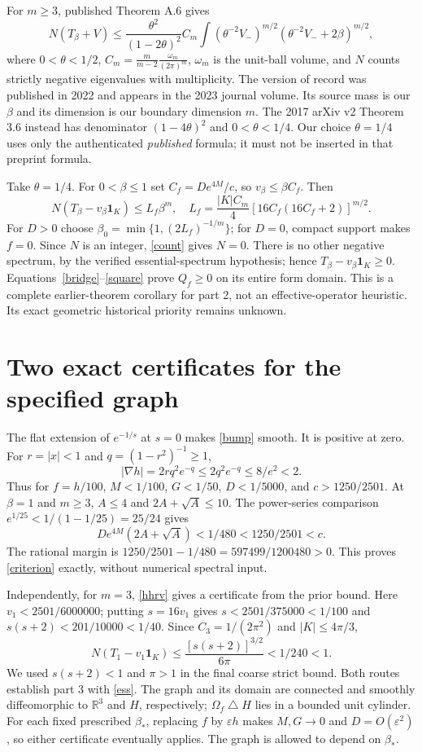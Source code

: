 \documentclass[11pt]{article}
\newcommand{\R}{\mathbb R}
\begin{document}
For $m\ge3$, published Theorem A.6 gives
\begin{equation}\label{hhrv}
 N(T_\beta+V)\le\frac{\theta^2}{(1-2\theta)^2}C_m
 \int(\theta^{-2}V_-)^{m/2}
      (\theta^{-2}V_-+2\beta)^{m/2},
\end{equation}
where $0<\theta<1/2$, $C_m=\frac m{m-2}\frac{\omega_m}{(2\pi)^m}$,
$\omega_m$ is the unit-ball volume, and $N$ counts strictly negative
eigenvalues with multiplicity. The version of record was published in 2022
and appears in the 2023 journal volume. Its source mass is our $\beta$ and
its dimension is our boundary dimension $m$. The 2017 arXiv v2
Theorem 3.6 instead has denominator $(1-4\theta)^2$ and
$0<\theta<1/4$. Our choice $\theta=1/4$ uses only the authenticated
\emph{published} formula; it must not be inserted in that preprint formula.

Take $\theta=1/4$. For $0<\beta\le1$ set $C_f=D e^{4M}/c$,
so $v_\beta\le\beta C_f$. Then
\begin{equation}\label{count}
 N(T_\beta-v_\beta\mathbf1_K)
 \le L_f\beta^m,\quad
 L_f=\frac{|K|C_m}{4}[16C_f(16C_f+2)]^{m/2}.
\end{equation}
For $D>0$ choose
$\beta_0=\min\{1,(2L_f)^{-1/m}\}$; for $D=0$, compact support makes
$f=0$. Since $N$ is an integer, \eqref{count} gives $N=0$.
There is no other negative spectrum, by the verified essential-spectrum
hypothesis; hence $T_\beta-v_\beta\mathbf1_K\ge0$.
Equations~\eqref{bridge}--\eqref{square} prove $Q_f\ge0$ on its entire
form domain. This is a complete earlier-theorem corollary for part 2,
not an effective-operator heuristic. Its exact geometric historical priority
remains unknown.

\section{Two exact certificates for the specified graph}
The flat extension of $e^{-1/s}$ at $s=0$ makes \eqref{bump} smooth.
It is positive at zero. For $r=|x|<1$ and $q=(1-r^2)^{-1}\ge1$,
\[
 |\nabla h|=2r q^2e^{-q}\le2q^2e^{-q}\le8/e^2<2.
\]
Thus for $f=h/100$, $M<1/100$, $G<1/50$, $D<1/5000$,
and $c>1250/2501$. At $\beta=1$ and $m\ge3$, $A\le4$ and
$2A+\sqrt A\le10$. The power-series comparison
$e^{1/25}<1/(1-1/25)=25/24$ gives
\[
 D e^{4M}(2A+\sqrt A)<1/480<1250/2501<c.
\]
The rational margin is $1250/2501-1/480=597499/1200480>0$.
This proves \eqref{criterion} exactly, without numerical spectral input.

Independently, for $m=3$, \eqref{hhrv} gives a certificate from the prior
bound. Here $v_1<2501/6000000$; putting $s=16v_1$ gives
$s<2501/375000<1/100$ and $s(s+2)<201/10000<1/40$.
Since $C_3=1/(2\pi^2)$ and $|K|\le4\pi/3$,
\[
 N(T_1-v_1\mathbf1_K)\le\frac{[s(s+2)]^{3/2}}{6\pi}<1/240<1.
\]
We used $s(s+2)<1$ and $\pi>1$ in the final coarse strict bound.
Both routes establish part 3 with \eqref{ess}. The graph and its domain
are connected and smoothly diffeomorphic to $\R^3$ and $H$, respectively;
$\Omega_f\mathbin\triangle H$ lies in a bounded unit cylinder.
For each fixed prescribed $\beta_*$, replacing $f$ by $\varepsilon h$ makes
$M,G\to0$ and $D=O(\varepsilon^2)$, so either certificate eventually applies.
The graph is allowed to depend on $\beta_*$.
\end{document}
